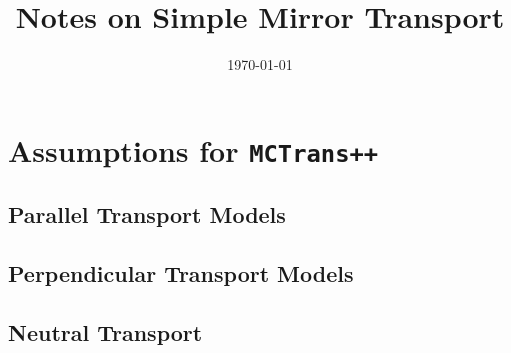 \documentclass{jpp}
\begin{document}
\date{\today}

\title{Notes on Simple Mirror Transport}
\author{\ianabel}


\maketitle
\section{Assumptions for \texttt{MCTrans++}}
\subsection{Parallel Transport Models}
\subsection{Perpendicular Transport Models}
\subsection{Neutral Transport}

\appendix
\end{document}
